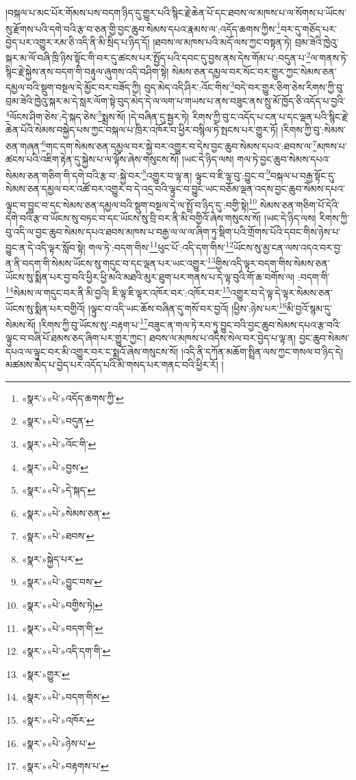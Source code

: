 །བསྐལ་པ་མང་པོར་གོམས་པས་བདག་ཉིད་དུ་གྱུར་པའི་སྙིང་རྗེ་ཆེན་པོ་དང་ཐབས་ལ་མཁས་པ་ལ་སོགས་པ་ཡོངས་སུ་རྫོགས་པའི་དགེ་བའི་རྩ་བ་ཅན་གྱི་བྱང་ཆུབ་སེམས་དཔའ་རྣམས་ལ་:འདོད་ཆགས་ཀྱིས་\footnote{«སྣར་»«པེ་»འདོད་ཆགས་ཀྱི་}བར་དུ་གཅོད་པར་བྱེད་པར་འགྱུར་རམ་ཅི་འདི་ནི་མི་སྲིད་པ་ཉིད་དོ། །ཐབས་ལ་མཁས་པའི་མདོ་ལས་ཀྱང་བསྟན་ཏེ། བྲམ་ཟེའི་ཁྱེའུ་སྐར་མ་ལོ་བཞི་ཁྲི་ཉིས་སྟོང་གི་བར་དུ་ཚངས་པར་སྤྱོད་པའི་དབང་དུ་བྱས་ནས་དེས་གོམ་པ་:བདུན་པ་\footnote{«སྣར་»«པེ་»བདུན་}ལ་གནས་ཏེ་སྙིང་རྗེ་སྐྱེས་ནས་བདག་གི་བརྟུལ་ཞུགས་འདི་བཤིག་སྟེ། སེམས་ཅན་དམྱལ་བར་སོང་བར་གྱུར་ཀྱང་སེམས་ཅན་དམྱལ་བའི་སྡུག་བསྔལ་དེ་མྱོང་བར་བཟོད་ཀྱི། བུད་མེད་འདི་ཤིར་:འོང་གིས་\footnote{«སྣར་»«པེ་»འོང་གི་}བདེ་བར་གྱུར་ཅིག་ཅེས་རིགས་ཀྱི་བུ་བྲམ་ཟེའི་ཁྱེའུ་སྐར་མ་དེ་སླར་ལོག་སྟེ་བུད་མེད་དེ་ལ་ལག་པ་གཡས་པ་ནས་བཟུང་ནས་སྲུ་མོ་ཁྱོད་ཅི་འདོད་པ་བྱའི་\footnote{«སྣར་»«པེ་»བྱས་}ལོངས་ཤིག་ཅེས་:དེ་སྐད་ཅེས་\footnote{«སྣར་»«པེ་»དེ་སྐད་}སྨྲས་སོ། །དེ་བཞིན་དུ་སྦྱར་ཏེ། རིགས་ཀྱི་བུ་ང་འདོད་པ་ངན་པ་དང་ལྡན་པའི་སྙིང་རྗེ་ཆེན་པོའི་སེམས་བསྐྱེད་པས་ཀྱང་བསྐལ་པ་ཁྲིར་འཁོར་བ་ཕྱིར་བསྙིལ་ཏེ་སྤངས་པར་གྱུར་ཏོ། །རིགས་ཀྱི་བུ་:སེམས་ཅན་གཞན་\footnote{«སྣར་»«པེ་»སེམས་ཅན་}གང་དག་སེམས་ཅན་དམྱལ་བར་སྐྱེ་བར་འགྱུར་བ་དེས་བྱང་ཆུབ་སེམས་དཔའ་:ཐབས་ལ་\footnote{«སྣར་»«པེ་»ཐབས་}མཁས་པ་ཚངས་པའི་འཇིག་རྟེན་དུ་སྐྱེས་པ་ལ་ལྟོས་ཞེས་གསུངས་སོ། །ཡང་དེ་ཉིད་ལས། གལ་ཏེ་བྱང་ཆུབ་སེམས་དཔའ་སེམས་ཅན་གཅིག་གི་དགེ་བའི་རྩ་བ་:སྐྱེ་བར་\footnote{«སྣར་»སྐྱེད་པར་}འགྱུར་བ་ལྟ་ན། ལྟུང་བ་ཇི་ལྟ་བུ་:བྱུང་བ་\footnote{«སྣར་»«པེ་»བྱུང་བས་}བསྐལ་པ་བརྒྱ་སྟོང་དུ་སེམས་ཅན་དམྱལ་བར་འཚོ་བར་འགྱུར་བ་དེ་འདྲ་བའི་ལྟུང་བ་བྱུང་ཡང་བཅོམ་ལྡན་འདས་བྱང་ཆུབ་སེམས་དཔའ་ལྟུང་བ་བྱུང་བ་དང་སེམས་ཅན་དམྱལ་བའི་སྡུག་བསྔལ་དེ་ལ་སྤྲོ་བ་ཉིད་དུ་:བགྱི་སྟེ།\footnote{«སྣར་»«པེ་»བགྱིས་ཏེ།} སེམས་ཅན་གཅིག་པོ་དེའི་དགེ་བའི་རྩ་བ་ཡོངས་སུ་བཏང་བ་དང་ཡོངས་སུ་བྲི་བར་ནི་མི་བགྱིའོ་ཞེས་གསུངས་སོ། །ཡང་དེ་ཉིད་ལས། རིགས་ཀྱི་བུ་འདི་ལ་བྱང་ཆུབ་སེམས་དཔའ་ཐབས་མཁས་པ་བརྒྱ་ལ་ལ་ལ་ཞིག་ཏུ་སྡིག་པའི་གྲོགས་པོའི་དབང་གིས་ཉེས་པ་བྱུང་ན་དེ་འདི་ལྟར་སློབ་སྟེ། གལ་ཏེ་:བདག་གིས་\footnote{«སྣར་»«པེ་»བདག་གི་}ཕུང་པོ་:འདི་དག་གིས་\footnote{«སྣར་»«པེ་»འདི་དག་གི་}ཡོངས་སུ་མྱ་ངན་ལས་འདའ་བར་བྱ་ན་ནི་བདག་གི་སེམས་ཡོངས་སུ་གདུང་བ་དང་ལྡན་པར་ཡང་འགྱུར་\footnote{«སྣར་»གྱུར་}གྱིས་འདི་ལྟར་བདག་གིས་སེམས་ཅན་ཡོངས་སུ་སྨིན་པར་བྱ་བའི་ཕྱིར་ཕྱི་མའི་མཐའི་མུར་ཐུག་པར་གནས་པ་དེ་ལྟ་བུའི་གོ་ཆ་བགོས་ལ། :བདག་གི་\footnote{«སྣར་»«པེ་»བདག་གིས་}སེམས་ལ་གདུང་བར་ནི་མི་བྱའི། ཇི་ལྟ་ཇི་ལྟར་འཁོར་བར་:འཁོར་བར་\footnote{«སྣར་»«པེ་»འཁོར་}འགྱུར་བ་དེ་ལྟ་དེ་ལྟར་སེམས་ཅན་ཡོངས་སུ་སྨིན་པར་བགྱིའོ། །ལྟུང་བ་འདི་ཡང་ཆོས་བཞིན་དུ་གསོ་བར་བྱའོ། །ཕྱིས་:ཉེས་པར་\footnote{«སྣར་»«པེ་»ཉེས་པ་}མི་བྱའོ་སྙམ་དུ་སེམས་སོ། །རིགས་ཀྱི་བུ་ཡོངས་སུ་:བརྟག་པ་\footnote{«སྣར་»«པེ་»བརྟགས་པ་}བཟུང་ན་གལ་ཏེ་རབ་ཏུ་བྱུང་བའི་བྱང་ཆུབ་སེམས་དཔའ་རྩ་བའི་ལྟུང་བ་བཞི་པོ་ཐམས་ཅད་ཞིག་པར་གྱུར་ཀྱང་། ཐབས་ལ་མཁས་པ་འདིས་སེལ་བར་བྱེད་པ་ལྟ་ན། བྱང་ཆུབ་སེམས་དཔའ་ལ་ལྟུང་བར་མི་འགྱུར་བར་ང་སྨྲའོ་ཞེས་གསུངས་སོ། །འདི་ནི་དཀོན་མཆོག་སྤྲིན་ལས་ཀྱང་གསལ་བ་ཉིད་དེ། མཚམས་མེད་པ་བྱེད་པར་འདོད་པའི་མི་གསད་པར་གནང་བའི་ཕྱིར་རོ། །
